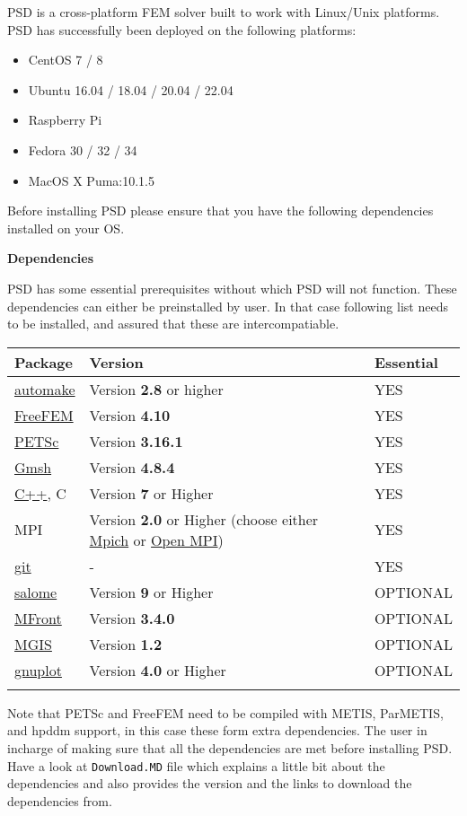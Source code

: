 PSD is a cross-platform FEM solver built to work with Linux/Unix
platforms. PSD has successfully been deployed on the following
platforms:

\begin{itemize}
\tightlist
\item
  CentOS 7 / 8
\item
  Ubuntu 16.04 / 18.04 / 20.04 / 22.04
\item
  Raspberry Pi
\item
  Fedora 30 / 32 / 34
\item
  MacOS X Puma:10.1.5
\end{itemize}

Before installing PSD please ensure that you have the following
dependencies installed on your OS.

\textbf{Dependencies}

PSD has some essential prerequisites without which PSD will not
function. These dependencies can either be preinstalled by user. In that
case following list needs to be installed, and assured that these are
intercompatiable.

\begin{longtable}[]{@{}lll@{}}
\toprule
Package & Version & Essential\tabularnewline
\midrule
\endhead
\href{https://www.gnu.org/software/automake/}{automake} & Version
\textbf{2.8} or higher & YES\tabularnewline
\href{https://freefem.org/}{FreeFEM} & Version \textbf{4.10} &
YES\tabularnewline
\href{https://www.mcs.anl.gov/petsc/}{PETSc} & Version \textbf{3.16.1} &
YES\tabularnewline
\href{http://gmsh.info/}{Gmsh} & Version \textbf{4.8.4} &
YES\tabularnewline
\href{http://www.cplusplus.com/}{C++}, C & Version \textbf{7} or Higher
& YES\tabularnewline
MPI & Version \textbf{2.0} or Higher (choose either
\href{https://www.mpich.org/}{Mpich} or
\href{https://www.open-mpi.org/}{Open MPI}) & YES\tabularnewline
\href{https://git-scm.com/}{git} & - & YES\tabularnewline
\href{https://www.salome-platform.org/}{salome} & Version \textbf{9} or
Higher & OPTIONAL\tabularnewline
\href{http://tfel.sourceforge.net/}{MFront} & Version \textbf{3.4.0} &
OPTIONAL\tabularnewline
\href{https://thelfer.github.io/mgis/web/bindings-cxx.html}{MGIS} &
Version \textbf{1.2} & OPTIONAL\tabularnewline
\href{http://www.gnuplot.info/}{gnuplot} & Version \textbf{4.0} or
Higher & OPTIONAL\tabularnewline
& &\tabularnewline
\bottomrule
\end{longtable}

Note that PETSc and FreeFEM need to be compiled with METIS, ParMETIS,
and hpddm support, in this case these form extra dependencies. The user
in incharge of making sure that all the dependencies are met before
installing PSD. Have a look at \lstinline!Download.MD! file which
explains a little bit about the dependencies and also provides the
version and the links to download the dependencies from.


